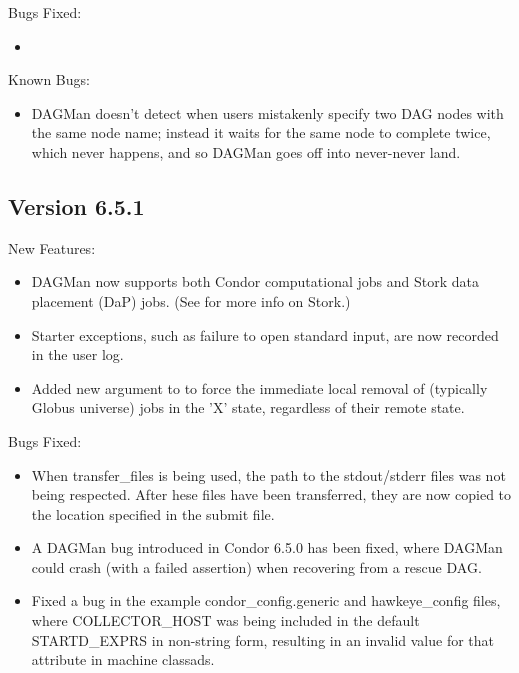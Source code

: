 \noindent Bugs Fixed:
\begin{itemize}

\item 

\end{itemize}

\noindent Known Bugs:
\begin{itemize}

\item DAGMan doesn't detect when users mistakenly specify two
DAG nodes with the same node name; instead it waits for the
same node to complete twice, which never happens, and so DAGMan
goes off into never-never land.

\end{itemize}


\subsection{\label{sec:New-6-5-1}Version 6.5.1}

\noindent New Features:
\begin{itemize}

\item DAGMan now supports both Condor computational jobs and Stork data
placement (DaP) jobs.  (See 
for more info on Stork.)

\item Starter exceptions, such as failure to open standard input, are
now recorded in the user log.

\item Added new  argument to  to force the
immediate local removal of (typically Globus universe) jobs in the 'X'
state, regardless of their remote state.

\end{itemize}

\noindent Bugs Fixed:
\begin{itemize}

\item When transfer\_files is being used, the path to the stdout/stderr
files was not being respected.  After hese files have been transferred,
they are now copied to the location specified in the submit file.

\item A DAGMan bug introduced in Condor 6.5.0 has been fixed, where
DAGMan could crash (with a failed assertion) when recovering from a
rescue DAG.

\item Fixed a bug in the example condor\_config.generic and
hawkeye\_config files, where COLLECTOR\_HOST was being included in the
default STARTD\_EXPRS in non-string form, resulting in an invalid value
for that attribute in machine classads.

\end{itemize}

